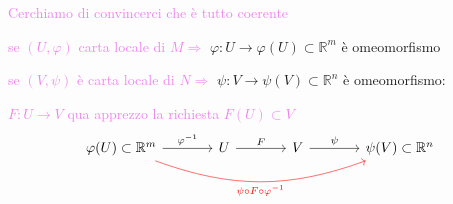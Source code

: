         \begin{osservazione}
        \mbox{}
        
        \textcolor{violet}{Cerchiamo di convincerci che è tutto coerente}
         
        \textcolor{violet}{se $(U, \varphi)$ carta locale di $M \Rightarrow$}
        $\varphi \colon U \to \varphi(U) \subset \mathbb{R}^m$ è omeomorfismo   
        
        \textcolor{violet}{se $(V,\psi)$ è carta locale di $N \Rightarrow$} 
        $\psi \colon V \to \psi(V) \subset \mathbb{R}^n$ è omeomorfismo:

        \textcolor{violet}{$F \colon U \to V$ qua apprezzo la richiesta $F(U) \subset V$}
        \[
        \begin{tikzcd}[column sep=large]
        \varphi(U) \subset \mathbb{R}^m
        \arrow[r, "\varphi^{-1}"]
        \arrow[rrr, bend right=20, red, "\psi \circ F \circ \varphi^{-1}"']
        & U \arrow[r, "F"]
        & V \arrow[r, "\psi"]
        & \psi(V) \subset \mathbb{R}^n
        \end{tikzcd}
        \]
        \end{osservazione}
